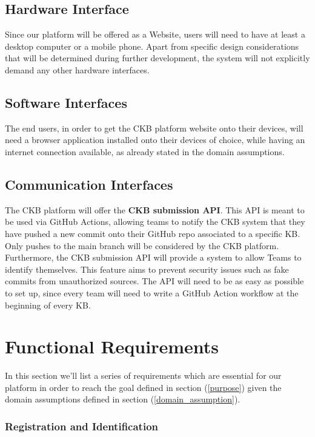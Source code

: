 \documentclass[11pt]{report}
\begin{document}
\subsection{Hardware Interface}
Since our platform will be offered as a Website, users will need to have at least a desktop computer or a mobile phone.
Apart from specific design considerations that will be determined during further development, the system will not explicitly demand any other hardware interfaces.

\subsection{Software Interfaces}
The end users, in order to get the CKB platform website onto their devices, will need a browser application installed onto their devices of choice, while having an internet connection available, as already stated in the domain assumptions.


\subsection{Communication Interfaces} \label{communication_interfaces}

The CKB platform will offer the \textbf{CKB submission API}.
This API is meant to be used via GitHub Actions, allowing teams to notify
the CKB system that they have pushed a new commit onto their GitHub repo associated to a specific KB\@.
Only pushes to the main branch will be considered by the CKB platform.
Furthermore, the CKB submission API will provide a system to allow Teams to identify themselves.
This feature aims to prevent security issues such as fake commits from unauthorized sources.
The API will need to be as easy as possible to set up, since every team will need to write a GitHub Action workflow at the beginning of every KB\@.




\section{Functional Requirements} \label{functional_requirements}
In this section we'll list a series of requirements which are essential for our platform in order to reach the goal defined in section (\ref{purpose}) given the domain assumptions defined in section (\ref{domain_assumption}).
 

\subsubsection*{Registration and Identification}
\end{document}
